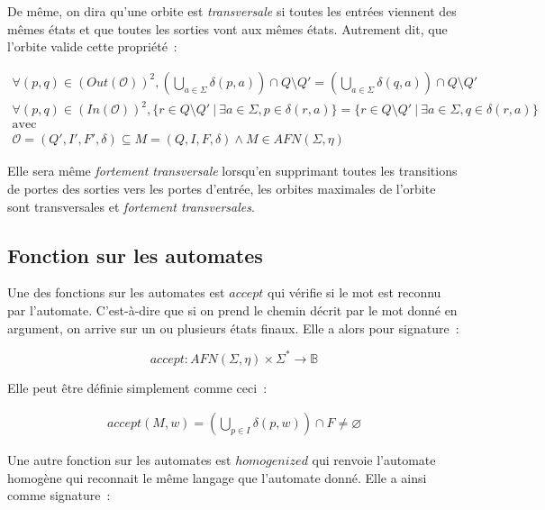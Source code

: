 \begin{definition}
    De même, on dira qu'une orbite est \textit{transversale} si toutes les
    entrées viennent des mêmes états et que toutes les sorties vont aux mêmes
    états. Autrement dit, que l'orbite valide cette propriété~:

    \begin{gather*}
        \forall (p, q) \in (Out(\mathcal{O}))^2, (\bigcup_{a \in \Sigma} \delta(p, a)) \cap Q \setminus Q' = (\bigcup_{a \in \Sigma} \delta(q, a)) \cap Q \setminus Q' \\
        \forall (p, q) \in (In(\mathcal{O}))^2, \{r \in Q \setminus Q' ~|~ \exists a \in \Sigma, p \in \delta(r, a)\} = \{r \in Q \setminus Q' ~|~ \exists a \in \Sigma, q \in \delta(r, a)\} \\
        \text{avec} \\
        \mathcal{O} = (Q', I', F', \delta) \subseteq M = (Q, I, F, \delta) \land M \in AFN(\Sigma, \eta)
    \end{gather*}

    \noindent Elle sera même \textit{fortement transversale} lorsqu'en
    supprimant toutes les transitions de portes des sorties vers les portes
    d'entrée, les orbites maximales de l'orbite sont transversales et
    \textit{fortement transversales}.
\end{definition}

\subsection{Fonction sur les automates}

Une des fonctions sur les automates est \(accept\) qui vérifie si le mot est
reconnu par l'automate. C'est-à-dire que si on prend le chemin décrit par le
mot donné en argument, on arrive sur un ou plusieurs états finaux. Elle a alors
pour signature~:

\[
    accept: AFN(\Sigma, \eta) \times \Sigma^* \to \mathbb{B}
\]

Elle peut être définie simplement comme ceci~:

\begin{align*}
    accept(M, w) = (\bigcup_{p \in I} \delta(p, w)) \cap F \neq \varnothing
\end{align*}

Une autre fonction sur les automates est \(homogenized\) qui renvoie l'automate
homogène qui reconnait le même langage que l'automate donné. Elle a ainsi comme
signature~:

